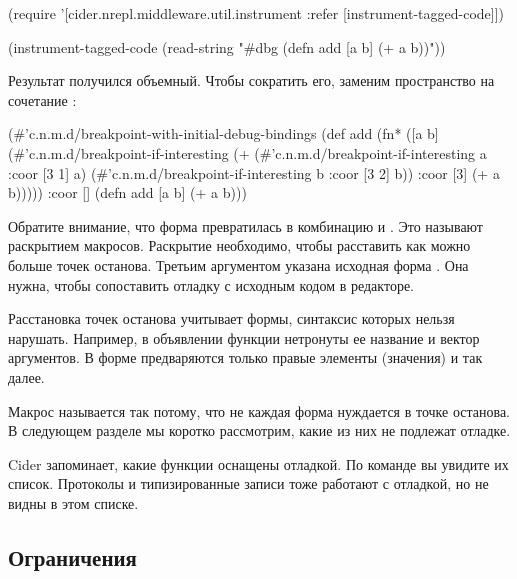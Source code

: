 \begin{english}
  \begin{clojure}
(require
 '[cider.nrepl.middleware.util.instrument
    :refer [instrument-tagged-code]])

(instrument-tagged-code
 (read-string "#dbg (defn add [a b] (+ a b))"))
  \end{clojure}
\end{english}

Результат получился объемный. Чтобы сократить его, заменим пространство  на сочетание :

\begin{english}
  \begin{clojure}
(#'c.n.m.d/breakpoint-with-initial-debug-bindings
 (def
  add
  (fn*
   ([a b]
    (#'c.n.m.d/breakpoint-if-interesting
     (+
      (#'c.n.m.d/breakpoint-if-interesting
       a {:coor [3 1]} a)
      (#'c.n.m.d/breakpoint-if-interesting
       b {:coor [3 2]} b))
     {:coor [3]}
     (+ a b)))))
 {:coor []}
 (defn add [a b] (+ a b)))
  \end{clojure}
\end{english}


Обратите внимание, что форма  превратилась в комбинацию  и . Это называют раскрытием макросов. Раскрытие необходимо, чтобы расставить как можно больше точек останова. Третьим аргументом указана исходная форма . Она нужна, чтобы сопоставить отладку с исходным кодом в редакторе.

Расстановка точек останова учитывает формы, синтаксис которых нельзя нарушать. Например, в объявлении функции нетронуты ее название и вектор аргументов. В форме  предваряются только правые элементы (значения) и так далее.

Макрос  называется так потому, что не каждая форма нуждается в точке останова. В следующем разделе мы коротко рассмотрим, какие из них не подлежат отладке.

Cider запоминает, какие функции оснащены отладкой. По команде  вы увидите их список. Протоколы и типизированные записи тоже работают с отладкой, но не видны в этом списке.

\subsection{Ограничения}

